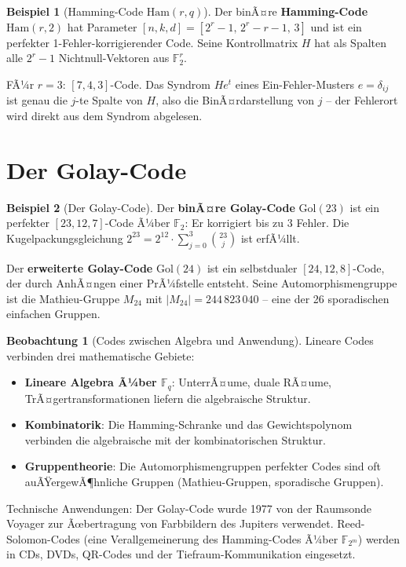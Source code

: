 ﻿\documentclass[a4paper,12pt]{report}
\theoremstyle{definition}
\newtheorem{beispiel}{Beispiel}
\newtheorem{beobachtung}{Beobachtung}
\begin{document}
\begin{beispiel}[Hamming-Code $\mathrm{Ham}(r, q)$]
    Der binÃ¤re \textbf{Hamming-Code} $\mathrm{Ham}(r, 2)$ hat Parameter
    $[n, k, d] = [2^r - 1,\, 2^r - r - 1,\, 3]$ und ist ein perfekter
    1-Fehler-korrigierender Code. Seine Kontrollmatrix $H$ hat als Spalten
    alle $2^r - 1$ Nichtnull-Vektoren aus $\mathbb{F}_2^r$.

    FÃ¼r $r = 3$: $[7, 4, 3]$-Code. Das Syndrom $He^t$ eines
    Ein-Fehler-Musters $e = \delta_{ij}$ ist genau die $j$-te Spalte von $H$,
    also die BinÃ¤rdarstellung von $j$ -- der Fehlerort wird direkt aus dem
    Syndrom abgelesen.
\end{beispiel}

\section{Der Golay-Code}

\begin{beispiel}[Der Golay-Code]
    Der \textbf{binÃ¤re Golay-Code} $\mathrm{Gol}(23)$ ist ein
    perfekter $[23, 12, 7]$-Code Ã¼ber $\mathbb{F}_2$: Er korrigiert
    bis zu $3$ Fehler. Die Kugelpackungsgleichung
    $2^{23} = 2^{12} \cdot \sum_{j=0}^3 \binom{23}{j}$ ist erfÃ¼llt.

    Der \textbf{erweiterte Golay-Code} $\mathrm{Gol}(24)$ ist ein
    selbstdualer $[24, 12, 8]$-Code, der durch AnhÃ¤ngen einer PrÃ¼fstelle
    entsteht. Seine Automorphismengruppe ist die Mathieu-Gruppe $M_{24}$
    mit $|M_{24}| = 244\,823\,040$ -- eine der 26 sporadischen einfachen
    Gruppen.
\end{beispiel}

\begin{beobachtung}[Codes zwischen Algebra und Anwendung]
    Lineare Codes verbinden drei mathematische Gebiete:
    \begin{itemize}
        \item[-] \textbf{Lineare Algebra Ã¼ber $\mathbb{F}_q$}: UnterrÃ¤ume,
              duale RÃ¤ume, TrÃ¤gertransformationen liefern die algebraische Struktur.
        \item[-] \textbf{Kombinatorik}: Die Hamming-Schranke und das
              Gewichtspolynom verbinden die algebraische mit der kombinatorischen Struktur.
        \item[-] \textbf{Gruppen\-theorie}: Die Auto\-morphismen\-gruppen perfekter Codes
              sind oft auÃŸer\-ge\-wÃ¶hn\-liche Gruppen
              (Mathieu-Gruppen, sporadische Gruppen).
    \end{itemize}

    Technische Anwendungen: Der Golay-Code wurde 1977 von der Raumsonde
    Voyager zur Ãœbertragung von Farbbildern des Jupiters verwendet.
    Reed-Solomon-Codes (eine Verallgemeinerung des Hamming-Codes Ã¼ber
    $\mathbb{F}_{2^m}$) werden in CDs, DVDs, QR-Codes und der
    Tief\-raum-Kommunikation eingesetzt.
\end{beobachtung}
\end{document}
